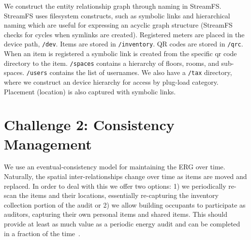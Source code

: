 We construct the entity relationship graph through naming in StreamFS.  StreamFS uses filesystem constructs, such as symbolic
links and hierarchical naming which are useful for expressing an acyclic graph structure (StreamFS checks for cycles when symlinks 
are created).  
Registered meters are placed in the device path, {\tt /dev}.  Items are stored in {\tt /inventory}.  QR codes are stored 
in {\tt /qrc}.  When an item is registered a 
symbolic link is created from the specific qr code directory to the item.  {\tt /spaces} contains a hierarchy of floors, rooms, 
and sub-spaces.  {\tt /users} contains the list of usernames.  We also have a {\tt /tax} directory, where we construct an
device hierarchy for access by plug-load category.  Placement (location) is also captured with symbolic links. 

\section{Challenge 2: Consistency Management}
We use an eventual-consistency model for maintaining the ERG over time.  Naturally, the spatial inter-relationships
change over time as items are moved and replaced.  In order to deal with this we offer two options: 1) we periodically
re-scan the items and their locations, essentially re-capturing the inventory collection portion of the audit or
2) we allow building occupants to participate as auditors, capturing their own personal items and shared items.
This should provide at least as much value as a periodic energy audit and can be completed in a fraction of the 
time~\cite{aceee_mobileaudit}.


